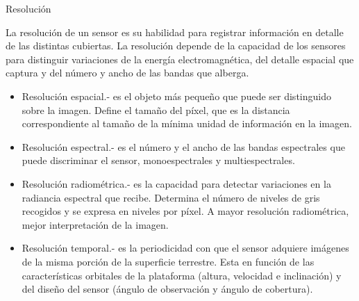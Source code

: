 \begin{frame}{Resolución}
    \footnotesize
    
    La resolución de un sensor es su habilidad para registrar información en detalle de las distintas cubiertas. La resolución depende de la capacidad de los sensores para distinguir variaciones de la energía electromagnética, del detalle espacial que captura y del número y ancho de las bandas que alberga.
    
    \begin{itemize}
        \item Resolución espacial.- es el objeto más pequeño que puede ser distinguido sobre la imagen. Define el tamaño del píxel, que es la distancia correspondiente al tamaño de la mínima unidad de información en la imagen.
    
        \item Resolución espectral.- es el número y el ancho de las bandas espectrales que puede discriminar el sensor, monoespectrales y multiespectrales.
    
        \item Resolución radiométrica.- es la capacidad para detectar variaciones en la radiancia espectral que recibe. Determina el número de niveles de gris recogidos y se expresa en niveles por píxel. A mayor resolución radiométrica, mejor interpretación de la imagen.
    
        \item Resolución temporal.- es la periodicidad con que el sensor adquiere imágenes de la misma porción de la superficie terrestre. Esta en función de las características orbitales de la plataforma (altura, velocidad e inclinación) y del diseño del sensor (ángulo de observación y ángulo de cobertura).
    \end{itemize}
\end{frame}

